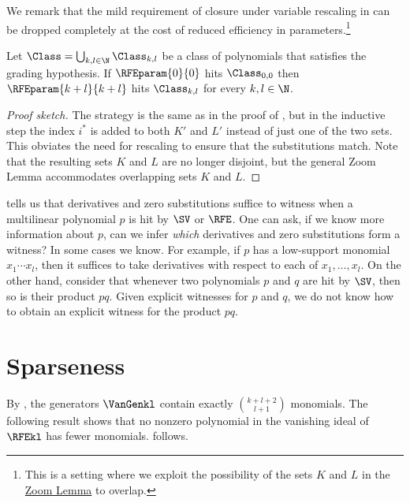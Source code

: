 We remark that the mild requirement of closure under variable rescaling in  can be dropped completely at the cost of reduced efficiency in parameters.\footnote{This is a setting where we exploit the possibility of the sets $K$ and $L$ in the \hyperref[lem.multi-zsub-deriv]{Zoom Lemma} to overlap.}
\begin{proposition}\label{prop.zsub-deriv-power-variant}
Let $\Class = \bigcup_{k,l \in \N} \Class_{k,l}$ be a class of polynomials that satisfies the grading hypothesis. If $\RFEparam{0}{0}$ hits $\Class_{0,0}$ then 
\(\RFEparam{k+l}{k+l}\) hits \(\Class_{k,l}\) for every \(k,l \in \N\).
\end{proposition}
\begin{proof}[Proof sketch]
The strategy is the same as in the proof of , but in the inductive step the index $i^*$ is added to both $K'$ and $L'$ instead of just one of the two sets. This obviates the need for rescaling to ensure that the substitutions match. Note that the resulting sets $K$ and $L$ are no longer disjoint, but the general Zoom Lemma accommodates overlapping sets $K$ and $L$.
\end{proof}

 tells us that derivatives and zero substitutions
suffice to witness when a multilinear polynomial \(p\) is hit by \(\SV\) or
\(\RFE\).
One can ask,
if we know more information about \(p\),
can we infer \emph{which} derivatives and zero substitutions form a witness?
In some cases we know.
For example,
if \(p\) has a low-support monomial \(x_1\cdots x_l\),
then it suffices to take derivatives with respect to each of
\(x_1,\ldots,x_l\).
On the other hand,
consider that whenever two polynomials \(p\) and \(q\) are hit by \(\SV\),
then so is their product \(pq\).
Given explicit witnesses for \(p\) and \(q\),
we do not know how to obtain an explicit witness for the product \(pq\).



\section{Sparseness}
\label{s.sparse}

By ,
the generators $\VanGenkl$ contain exactly $\binom{k+l+2}{l+1}$ monomials.
The following result shows that no nonzero polynomial in the vanishing ideal
of $\RFEkl$ has fewer monomials.
 follows.

